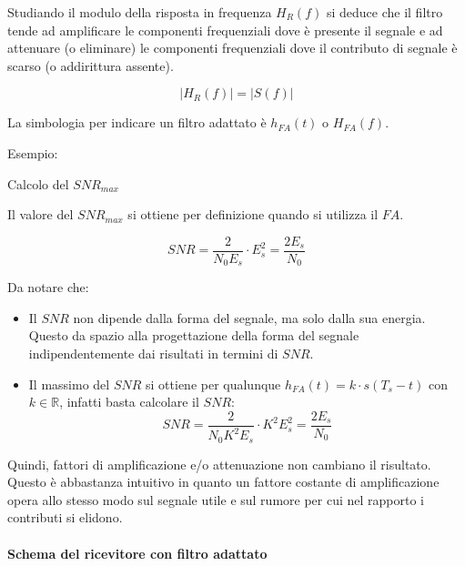 Studiando il modulo della risposta in frequenza \( H_R(f) \) si deduce che il filtro tende ad amplificare le componenti frequenziali dove è presente il segnale e ad attenuare (o eliminare) le componenti frequenziali dove il contributo di segnale è scarso (o addirittura assente).

\[
\left| H_R(f) \right| = \left| S(f) \right|
\]

La simbologia per indicare un filtro adattato è \( h_{FA}(t) \) o \( H_{FA}(f) \).

Esempio:


Calcolo del \( SNR_{max} \)

Il valore del \( SNR_{max} \) si ottiene per definizione quando si utilizza il \( FA \).

\[
SNR = \frac{2}{N_0 E_s} \cdot E_s^2 = \frac{2E_s}{N_0}
\]

Da notare che:

\begin{itemize}
    \item Il \( SNR \) non dipende dalla forma del segnale, ma solo dalla sua energia. Questo da spazio alla progettazione della forma del segnale indipendentemente dai risultati in termini di \( SNR \).
    \item Il massimo del \( SNR \) si ottiene per qualunque \( h_{FA}(t) = k \cdot s(T_s-t) \) con \( k \in \mathbb{R} \), infatti basta calcolare il $SNR$:
    \[ SNR = \frac{2}{N_0K^2 E_s} \cdot K^2 E_s^2 = \frac{2 E_s}{N_0} \]
\end{itemize}

Quindi, fattori di amplificazione e/o attenuazione non cambiano il risultato. Questo è abbastanza intuitivo in quanto un fattore costante di amplificazione opera allo stesso modo sul segnale utile e sul rumore per cui nel rapporto i contributi si elidono.

\paragraph*{Schema del ricevitore con filtro adattato}

